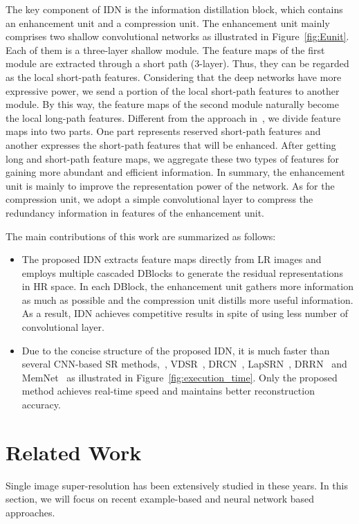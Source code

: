 \documentclass[10pt,twocolumn,letterpaper]{article}
\begin{document}
The key component of IDN is the information distillation block, which contains an enhancement unit and a compression unit. The enhancement unit mainly comprises two shallow convolutional networks as illustrated in Figure~\ref{fig:Eunit}. Each of them is a three-layer shallow module. The feature maps of the first module are extracted through a short path (3-layer). Thus, they can be regarded as the local short-path features. Considering that the deep networks have more expressive power, we send a portion of the local short-path features to another module. By this way, the feature maps of the second module naturally become the local long-path features. Different from the approach in~\cite{SENet}, we divide feature maps into two parts. One part represents reserved short-path features and another expresses the short-path features that will be enhanced. After getting long and short-path feature maps, we aggregate these two types of features for gaining more abundant and efficient information. In summary, the enhancement unit is mainly to improve the representation power of the network. As for the compression unit, we adopt a simple convolutional layer to compress the redundancy information in features of the enhancement unit.

The main contributions of this work are summarized as follows:
\begin{itemize}
	\item The proposed IDN extracts feature maps directly from LR images and employs multiple cascaded DBlocks to generate the residual representations in HR space. In each DBlock, the enhancement unit gathers more information as much as possible and the compression unit distills more useful information. As a result, IDN achieves competitive results in spite of using less number of convolutional layer.
	\item Due to the concise structure of the proposed  IDN, it is much faster than several CNN-based SR methods,~\eg, VDSR~\cite{VDSR}, DRCN~\cite{DRCN}, LapSRN~\cite{LapSRN}, DRRN~\cite{DRRN} and MemNet~\cite{MemNet} as illustrated in Figure~\ref{fig:execution_time}. Only the proposed method achieves real-time speed and maintains better reconstruction accuracy.
\end{itemize}

\section{Related Work}

Single image super-resolution has been extensively studied in these years. In this section, we will focus on recent example-based and neural network based approaches.
\end{document}
